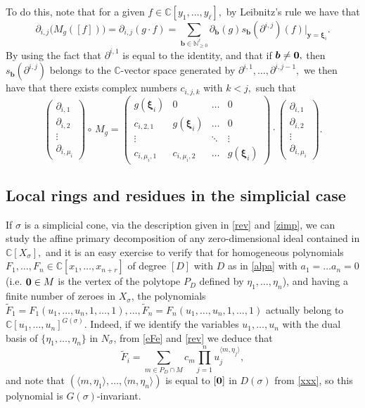\documentclass[a4paper,11pt]{amsart}
\newcommand{\C}{\mathbb{C}}
\newcommand{\N}{\mathbb{N}}
\newcommand{\bfb}{{\boldsymbol{b}}}
\newcommand{\bfy}{{\boldsymbol{y}}}
\newcommand{\bfxi}{{\boldsymbol{\xi}}}
\numberwithin{thm}{section}
\numberwithin{equation}{section}
\theoremstyle{definition}
\theoremstyle{plain}
\begin{document}
To do this, note that for a given $f\in\C[y_1,\ldots, y_\ell],$ by Leibnitz's rule we have that
\begin{equation}\label{dprod}
\partial_{i,j}\big(M_g([f])\big)=\partial_{i,j}(g\cdot f)=\sum_{\bfb\in\N_{\geq0}^\ell} \partial_\bfb(g)s_\bfb(\partial^{i,j})(f) |_{\bfy=\bfxi_i}.
\end{equation}
By using the fact that $\partial^{i,1}$ is equal to the identity, and that if $\bfb\neq\bf0,$ then $s_\bfb(\partial^{i,j})$ belongs to the $\C$-vector space generated by $\partial^{i,1},\ldots, \partial^{i,j-1},$ we then have that there exists complex numbers $c_{i,j,k}$  with $k<j,$ such that
\begin{equation}\label{triang}
\begin{pmatrix}
\partial_{i,1}\\ \partial_{i,2}\\ \vdots\\  \partial_{i,\mu_i}
\end{pmatrix}\circ \, M_g= 
\begin{pmatrix}
g(\bfxi_i) & 0 & \ldots & 0\\
c_{i,2,1}& g(\bfxi_i) &  \ldots &0  \\
\vdots & & \ddots& \vdots \\
c_{i,\mu_i,1}& c_{i,\mu_i,2} & \ldots & g(\bfxi_i)
\end{pmatrix}
\cdot
\begin{pmatrix}
\partial_{i,1}\\ \partial_{i,2}\\ \vdots\\  \partial_{i,\mu_i}
\end{pmatrix}.
\end{equation}





\medskip
\subsection{Local rings and residues in the simplicial case}\label{sss}
If $\sigma$ is a simplicial cone, via the description given in \eqref{rev} and \eqref{zimp}, we can  study the affine primary decomposition of any zero-dimensional ideal contained in $\C[X_\sigma],$ and it is an easy exercise to  verify that for homogeneous polynomials $F_1,\ldots, F_n\in\C[x_1,\ldots, x_{n+r}]$
of degree $[D]$ with $D$ as in \eqref{alpa} with $a_1=\ldots a_n=0$ (i.e. ${\bf0}\in M$ is the vertex of the polytope $P_D$ defined by $\eta_1,\ldots, \eta_n$), and
having a finite number of zeroes in $X_\sigma$, the polynomials $\tilde{F}_1=F_1(u_1,\ldots, u_n,1,\ldots, 1),\ldots, \tilde{F}_n=F_n(u_1,\ldots, u_n, 1,\ldots, 1)$ actually belong to $\C[u_1,\ldots, u_n]^{G(\sigma)}.$ Indeed, if we identify the variables $u_1,\ldots, u_n$ with the dual basis of $\{\eta_1,\ldots, \eta_n\}$ in $N_\sigma$, from \eqref{eFe} and \eqref{rev} we deduce that
$$
\tilde{F}_i=\sum_{m\in P_D\cap M}c_m\prod_{j=1}^{n}u_j^{\langle m,\eta_j\rangle},
$$
and note that $(\langle m,\eta_1\rangle,\ldots,\langle m,\eta_n\rangle)$ is equal to $[{\bf0}]$ in $D(\sigma)$ from \eqref{xxx}, so this polynomial is $G(\sigma)$-invariant. 
\end{document}
